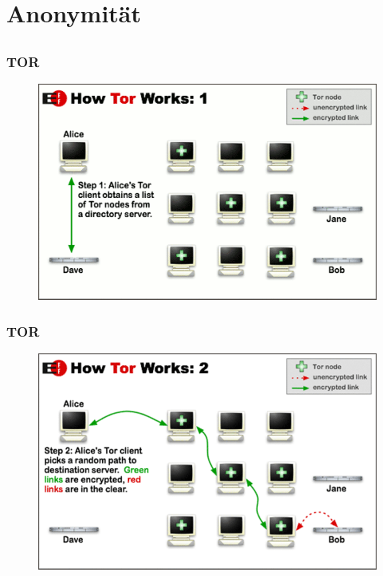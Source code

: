 \documentclass[12pt]{beamer}
\begin{document}
\section{Anonymität}
\subsection{}

\begin{frame}
  \frametitle{TOR}
  \begin{figure}
    \includegraphics[height=0.7\textheight]{img/tor-1.png}
  \end{figure}
\end{frame}

\begin{frame}
  \frametitle{TOR}
  \begin{figure}
    \includegraphics[height=0.7\textheight]{img/tor-2.png}
  \end{figure}
\end{frame}
\end{document}
